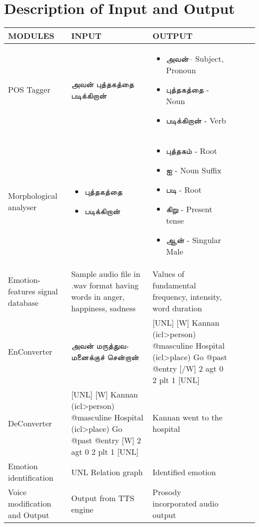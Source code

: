 \documentclass{article}
\begin{document}
\section{Description of Input and Output}\large
\begin{center}
\begin{tabularx}{\linewidth}{|@{}lYYYYY@{}|}
\hline\hline
MODULES & INPUT & OUTPUT\\
\hline
POS Tagger & \texttamil{அவன் புத்தகத்தை படிக்கிறான்} &  
\begin{itemize}
\item \texttamil{அவன்}– Subject, Pronoun
\item \texttamil{ புத்தகத்தை }- Noun
\item \texttamil{ படிக்கிறான் }- Verb
\end{itemize}\\
\hline
\item Morphological analyser &
\begin{itemize}
\item \texttamil{புத்தகத்தை} 
\item \texttamil{ படிக்கிறான் }
\end{itemize} &
\begin{itemize}
\item \texttamil{ புத்தகம்  }- Root
\item \texttamil{ ஐ  }- Noun Suffix
\item \texttamil{ படி }- Root
\item \texttamil{ கிறு  }- Present tense
\item \texttamil{ ஆன்  }-  Singular Male
\end{itemize}\\
\hline
Emotion-features signal database &
Sample audio file in .wav format having words in anger, happiness, sadness &
Values of fundamental frequency, intensity, word duration\\
\hline
EnConverter &
\texttamil{அவன் மருத்துவமனைக்குச் சென்றான்}
&
[UNL]
[W]
Kannan (icl>person) @masculine
Hospital (icl>place)
Go @past @entry
[/W]
2 agt 0
2 plt 1
[UNL]\\ 
\hline
DeConverter &
[UNL]
[W]
Kannan (icl>person) @masculine
Hospital (icl>place) 
Go @past @entry
[W]
2 agt 0
2 plt 1
[UNL] &
Kannan went to the hospital\\
\hline
Emotion identification &
UNL Relation graph &
Identified emotion\\
\hline
Voice modification and Output &
Output from TTS engine &
Prosody incorporated audio output\\
\hline
\end{tabularx}
\end{center}
\end{document}

